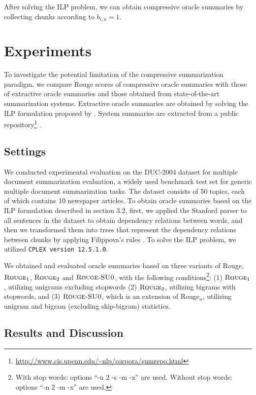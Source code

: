 \documentclass[11pt,a4paper]{article}
\begin{document}
After solving the ILP problem, we can obtain compressive oracle summaries
by collecting chunks according to $b_{i,u}{=}1$.

\section{Experiments}

To investigate the potential limitation of the compressive summarization
paradigm, we compare {\sc Rouge} scores of compressive oracle summaries
with those of extractive oracle summaries and those obtained from state-of-the-art
summarization systems.
Extractive oracle summaries
are obtained by solving the ILP formulation proposed by \citep{hirao:eacl2017}.
System summaries are extracted from 
 a public
 repository\footnote{
\url{http://www.cis.upenn.edu/~nlp/corpora/sumrepo.html}} \cite{HONG14LREC}.

\subsection{Settings}

We conducted experimental evaluation on the DUC-2004 dataset for multiple document
summarization evaluation, a widely used benchmark test set for generic multiple
document summarization tasks. The dataset consists of 50 topics, each
of which contains 10 newspaper articles.
To obtain oracle summaries based on the ILP formulation described in section 3.2,
first, we applied the Stanford parser \citep{stanford06} to all
sentences in the dataset
to obtain dependency relations between words, and then we transformed them into trees
that represent the dependency relations between chunks by applying
 Filippova's rules \citep{filippova08,filippova:2013}.
To solve the ILP problem, we utilized {\tt CPLEX version 12.5.1.0}.

We obtained and evaluated oracle summaries based on three variants of {\sc Rouge},
$\text{\sc Rouge}_{1}$, $\text{\sc Rouge}_{2}$ and $\text{\sc
Rouge-SU0}$, with the following conditions\footnote{
With stop words: options ``-n 2 -s -m -x'' are used.
Without stop words: options ``-n 2 -m -x'' are used.
}:
(1) $\text{\sc Rouge}_{1}$, utilizing unigrams excluding stopwords
(2) $\text{\sc Rouge}_{2}$, utilizing bigrams with stopwords, and
(3) $\text{\sc Rouge-SU0}$, which is an extension of {\sc Rouge}$_n$,
utilizing unigram and bigram (excluding skip-bigram) statistics.


\subsection{Results and Discussion}
\end{document}
